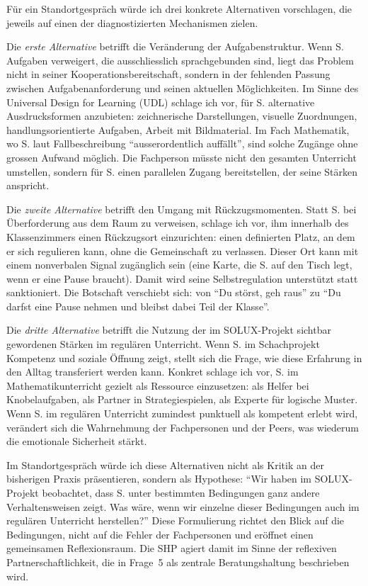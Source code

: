 \documentclass[ngerman, a4paper]{article}
\begin{document}
Für ein Standortgespräch würde ich drei konkrete Alternativen vorschlagen, die
jeweils auf einen der diagnostizierten Mechanismen zielen.

Die \textit{erste Alternative} betrifft die Veränderung der Aufgabenstruktur.
Wenn S. Aufgaben verweigert, die ausschliesslich sprachgebunden sind, liegt
das Problem nicht in seiner Kooperationsbereitschaft, sondern in der fehlenden
Passung zwischen Aufgabenanforderung und seinen aktuellen Möglichkeiten. Im
Sinne des Universal Design for Learning (UDL) \parencite[Version~3.0]{cast2024udlguidelines}
schlage ich vor, für S. alternative
Ausdrucksformen anzubieten: zeichnerische Darstellungen, visuelle Zuordnungen,
handlungsorientierte Aufgaben, Arbeit mit Bildmaterial. Im Fach Mathematik, wo
S. laut Fallbeschreibung \enquote{ausserordentlich auffällt}, sind solche Zugänge
ohne grossen Aufwand möglich. Die Fachperson müsste nicht den gesamten Unterricht
umstellen, sondern für S. einen parallelen Zugang bereitstellen, der seine
Stärken anspricht.

Die \textit{zweite Alternative} betrifft den Umgang mit Rückzugsmomenten. Statt
S. bei Überforderung aus dem Raum zu verweisen, schlage ich vor, ihm innerhalb
des Klassenzimmers einen Rückzugsort einzurichten: einen definierten Platz,
an dem er sich regulieren kann, ohne die Gemeinschaft zu verlassen. Dieser Ort
kann mit einem nonverbalen Signal zugänglich sein (eine Karte, die S. auf den
Tisch legt, wenn er eine Pause braucht). Damit wird seine Selbstregulation
unterstützt statt sanktioniert. Die Botschaft verschiebt sich: von
\enquote{Du störst, geh raus} zu \enquote{Du darfst eine Pause nehmen
  und bleibst dabei Teil der Klasse}.

Die \textit{dritte Alternative} betrifft die Nutzung der im SOLUX-Projekt
sichtbar gewordenen Stärken im regulären Unterricht. Wenn S. im Schachprojekt
Kompetenz und soziale Öffnung zeigt, stellt sich die Frage, wie diese
Erfahrung in den Alltag transferiert werden kann. Konkret schlage ich vor,
S. im Mathematikunterricht gezielt als Ressource einzusetzen: als Helfer bei
Knobelaufgaben, als Partner in Strategiespielen, als Experte für logische
Muster. Wenn S. im regulären Unterricht zumindest
punktuell als kompetent erlebt wird, verändert sich die Wahrnehmung der
Fachpersonen und der Peers, was wiederum die emotionale Sicherheit stärkt.

Im Standortgespräch würde ich diese Alternativen nicht als Kritik an der
bisherigen Praxis präsentieren, sondern als Hypothese: \enquote{Wir haben im
  SOLUX-Projekt beobachtet, dass S. unter bestimmten Bedingungen ganz andere
  Verhaltensweisen zeigt. Was wäre, wenn wir einzelne dieser Bedingungen auch
  im regulären Unterricht herstellen?} Diese Formulierung richtet den Blick
auf die Bedingungen, nicht auf die Fehler der Fachpersonen und eröffnet einen
gemeinsamen Reflexionsraum. Die SHP agiert damit im Sinne der reflexiven
Partnerschaftlichkeit, die in Frage~5 als zentrale Beratungshaltung
beschrieben wird.
\end{document}
